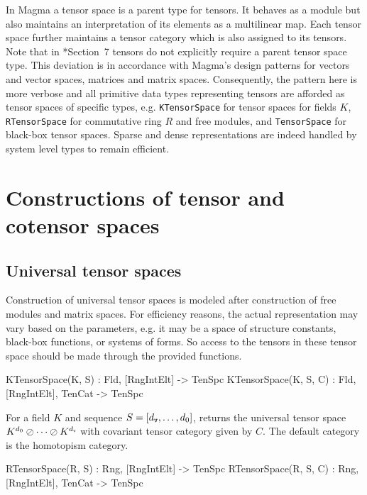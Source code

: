 
In Magma a tensor space is a parent type for tensors.  It behaves as a module
but also maintains an interpretation of its elements as a multilinear map.  Each
tensor space further maintains a tensor category which is also assigned to its
tensors.  Note that in \cite{FMW:densors}*{Section~7} tensors do not explicitly
require a parent tensor space type.  This deviation is in accordance with
Magma's design patterns for vectors and vector spaces, matrices and matrix
spaces.  Consequently, the pattern here is more verbose and all primitive data
types representing tensors are afforded as tensor spaces of specific types,
e.g. \texttt{KTensorSpace} for tensor spaces for fields $K$, 
\texttt{RTensorSpace} for commutative ring $R$ and free modules, and 
\texttt{TensorSpace} for black-box tensor spaces.  Sparse and dense representations
are indeed handled by system level types to remain efficient.


\section{Constructions of tensor and cotensor spaces}

\subsection{Universal tensor spaces}

Construction of universal tensor spaces is modeled after construction of free 
modules and matrix spaces. For efficiency reasons, the actual representation 
may 
vary based on the parameters, e.g. it may be a space of structure constants, 
black-box functions, or systems of forms. So access to the tensors in these 
tensor space should be made through the provided functions.

\begin{intrinsics}
KTensorSpace(K, S) : Fld, [RngIntElt] -> TenSpc
KTensorSpace(K, S, C) : Fld, [RngIntElt], TenCat -> TenSpc
\end{intrinsics}

For a field $K$ and sequence $S=[d_{\operatorname{\mathtt{v}}},\ldots, d_0]$, returns the universal
tensor space $K^{d_0}\oslash \cdots\oslash K^{d_{\operatorname{\mathtt{v}}}}$ with covariant tensor
category given by $C$. The default category is the homotopism category.

\begin{intrinsics}
RTensorSpace(R, S) : Rng, [RngIntElt] -> TenSpc
RTensorSpace(R, S, C) : Rng, [RngIntElt], TenCat -> TenSpc
\end{intrinsics}

